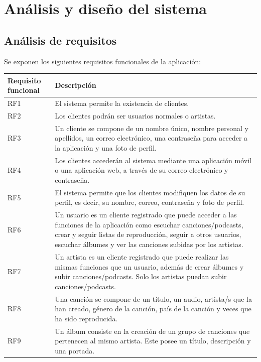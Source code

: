 \documentclass{article}
\begin{document}
\newpage
\section{Análisis y diseño del sistema}

\subsection{Análisis de requisitos}
Se exponen los siguientes requisitos funcionales de la aplicación:
\begin{table}[H]
	\begin{tabular}{p{4cm} p{10cm}}
		\hline
		\hline 
		\textbf{Requisito funcional}
		\vspace{0.5mm} & \textbf{Descripción} \\ 
		\hline
		\hline
		RF1
		& El sistema permite la existencia de clientes. \\ 
		\hline 
		RF2
		& Los clientes podrán ser usuarios normales o artistas. \\ 
		\hline
		RF3
		& Un cliente se compone de un nombre único, nombre personal y apellidos, un correo electrónico, una contraseña para acceder a la aplicación y una foto de perfil. \\ 
		\hline
		RF4
		& Los clientes accederán al sistema mediante una aplicación móvil o una aplicación web, a través de su correo electrónico y contraseña. \\ 
		\hline
		RF5
		& El sistema permite que los clientes modifiquen los datos de su perfil, es decir, su nombre, correo, contraseña y foto de perfil. \\ 
		\hline
		RF6
		& Un usuario es un cliente registrado que puede acceder a las funciones de la aplicación como escuchar canciones/podcasts, crear y seguir listas de reproducción, seguir a otros usuarios, escuchar álbumes y ver las canciones subidas por los artistas.  \\ 
		\hline
		RF7
		& Un artista es un cliente registrado que puede realizar las mismas funciones que un usuario, además de crear álbumes y subir canciones/podcasts. Solo los artistas puedan subir canciones/podcasts. \\ 
		\hline
		RF8
		&
		Una canción se compone de un título, un audio, artista/s que la han creado, género de la canción, país de la canción y veces que ha sido reproducida.\\
		\hline
		RF9
		&
		Un álbum consiste en la creación de un grupo de canciones que pertenecen al mismo artista. Este posee un título, descripción y una portada.\\

\end{tabular}
\end{table}
\end{document}
